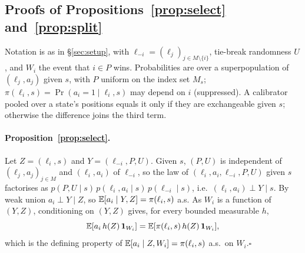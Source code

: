 
\subsection{Proofs of Propositions~\ref{prop:select} and~\ref{prop:split}}
\label{sec:app-proofs}

Notation is as in \S\ref{sec:setup}, with $\ell_{-i}=(\ell_j)_{j\in M\setminus\{i\}}$,
tie-break randomness $U$, and $W_i$ the event that $i\in P$ wins. Probabilities are over a
superpopulation of $(\ell_j,a_j)$ given $s$, with $P$ uniform on the index set $M_s$;
$\pi(\ell_i,s)=\Pr(a_i{=}1\mid\ell_i,s)$ may depend on $i$ (suppressed). A calibrator pooled over a
state's positions equals it only if they are exchangeable given $s$; otherwise the difference joins
the third term.

\paragraph{Proposition~\ref{prop:select}.}
Let $Z=(\ell_i,s)$ and $Y=(\ell_{-i},P,U)$. Given $s$, $(P,U)$ is independent of
$(\ell_j,a_j)_{j\in M}$ and $(\ell_i,a_i)$ of $\ell_{-i}$, so the law of
$(\ell_i,a_i,\ell_{-i},P,U)$ given $s$ factorises as
$p(P,U\mid s)\,p(\ell_i,a_i\mid s)\,p(\ell_{-i}\mid s)$, i.e.\ $(\ell_i,a_i)\perp Y\mid s$.
By weak union $a_i\perp Y\mid Z$, so $\mathbb{E}[a_i\mid Y,Z]=\pi(\ell_i,s)$ a.s. As $W_i$ is a function
of $(Y,Z)$, conditioning on $(Y,Z)$ gives, for every bounded measurable $h$,
\begin{equation}
  \mathbb{E}[a_i\,h(Z)\,\mathbf{1}_{W_i}] = \mathbb{E}[\pi(\ell_i,s)\,h(Z)\,\mathbf{1}_{W_i}],
  \label{eq:app-display}
\end{equation}
which is the defining property of $\mathbb{E}[a_i\mid Z,W_i]=\pi(\ell_i,s)$ a.s.\ on $W_i$.\hfill$\square$

